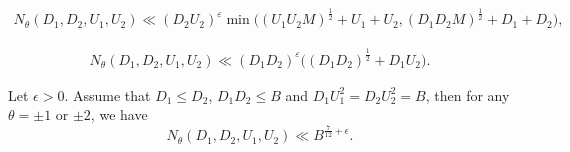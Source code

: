 \documentclass[10pt,a4paper]{amsart}
\newcommand{\eps}{\varepsilon}
\renewcommand{\leq}{\leqslant}
\begin{document}
\begin{align}\label{thm-Reu}
	N_\theta (D_1, D_2, U_1, U_2) \ll (D_2 U_2)^\eps \min \big((U_1U_2M)^\frac{1}{2} + U_1 + U_2, (D_1D_2M)^\frac{1}{2} + D_1 + D_2 \big), 
\end{align}

\begin{eqnarray}\label{thm-FJ}
	N_\theta (D_1, D_2, U_1, U_2) \ll (D_1D_2)^\eps \big((D_1D_2)^\frac{1}{2} + D_1U_2\big).
\end{eqnarray}

\begin{lemma}\label{Reu+FJ}
	Let $\epsilon > 0$. Assume that $D_1 \leq D_2$, $D_1 D_2 \leq B$ and $D_1U_1^2 = D_2 U_2^2 = B$, then for any $\theta = \pm 1$ or $\pm 2$, we have
	$$N_\theta(D_1, D_2, U_1, U_2) \ll B^{\frac{7}{12} + \epsilon}.$$
\end{lemma}
\end{document}
